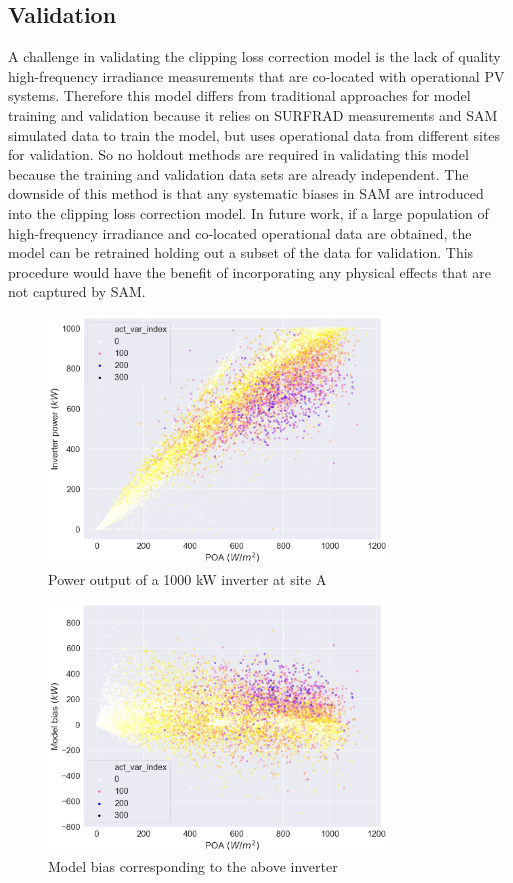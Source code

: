 \documentclass[conference]{IEEEtran}
\begin{document}
\subsection{Validation}
A challenge in validating the clipping loss correction model is the lack of quality high-frequency irradiance measurements that are co-located with operational PV systems. Therefore this model differs from traditional approaches for model training and validation because it relies on SURFRAD measurements and SAM simulated data to train the model, but uses operational data from different sites for validation. So no holdout methods are required in validating this model because the training and validation data sets are already independent. The downside of this method is that any systematic biases in SAM are introduced into the clipping loss correction model. In future work, if a large population of high-frequency irradiance and co-located operational data are obtained, the model can be retrained holding out a subset of the data for validation. This procedure would have the benefit of incorporating any physical effects that are not captured by SAM.

\begin{figure}[htbp]
\centerline{\includegraphics[width=9cm]{DCS_Inv_vs_POA_with_VI.png}}
\caption{Power output of a 1000 kW inverter at site A}
\label{fig:irradiance-and-power}
\end{figure}

\begin{figure}[htbp]
\centerline{\includegraphics[width=9cm]{DCS_ModelBias_vs_POA_with_VI.png}}
\caption{Model bias corresponding to the above inverter}
\label{fig:irradiance-and-power}
\end{figure}
\end{document}
